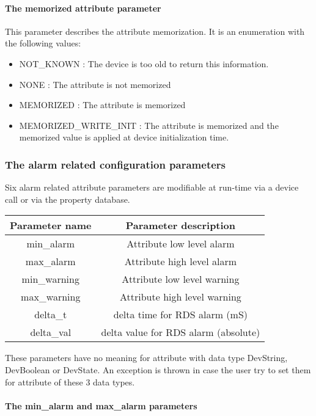 \paragraph{The memorized attribute parameter}

This parameter describes the attribute memorization. It is an enumeration
with the following values:
\begin{itemize}
\item NOT\_KNOWN : The device is too old to return this information.
\item NONE : The attribute is not memorized
\item MEMORIZED : The attribute is memorized
\item MEMORIZED\_WRITE\_INIT : The attribute is memorized and the memorized
value is applied at device initialization time.
\end{itemize}

\subsubsection{The alarm related configuration parameters}

Six alarm related attribute parameters are modifiable at run-time
via a device call or via the property database. 

\vspace{0.3cm}

\begin{center}
\begin{longtable}{|c|c|}
\hline 
Parameter name & Parameter description\tabularnewline
\hline 
\hline 
min\_alarm & Attribute low level alarm\tabularnewline
\hline 
max\_alarm & Attribute high level alarm\tabularnewline
\hline 
min\_warning & Attribute low level warning\tabularnewline
\hline 
max\_warning & Attribute high level warning\tabularnewline
\hline 
delta\_t & delta time for RDS alarm (mS)\tabularnewline
\hline 
delta\_val & delta value for RDS alarm (absolute)\tabularnewline
\hline 
\end{longtable}
\par\end{center}

\vspace{0.3cm}
These parameters have no meaning for attribute with data type DevString,
DevBoolean or DevState. An exception is thrown in case the user try
to set them for attribute of these 3 data types.

\paragraph{The min\_alarm and max\_alarm
parameters}

